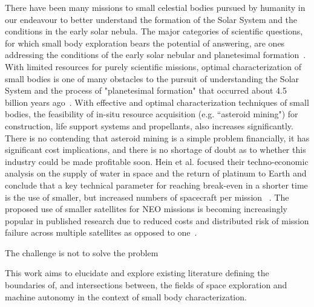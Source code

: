 There have been many missions to small celestial bodies pursued by humanity in our endeavour to better understand the formation of the Solar System and the conditions in the early solar nebula. The major categories of scientific questions, for which small body exploration bears the potential of answering, are ones addressing the conditions of the early solar nebular and planetesimal formation~\cite{Davidsson2021}. With limited resources for purely scientific missions, optimal characterization of small bodies is one of many obstacles to the pursuit of understanding the Solar System and the process of "planetesimal formation" that occurred about 4.5 billion years ago~\cite{Klahr2015}. With effective and optimal characterization techniques of small bodies, the feasibility of in-situ resource acquisition (e.g. ``asteroid mining") for construction, life support systems and propellants, also increases significantly. There is no contending that asteroid mining is a simple problem financially, it has significant cost implications, and there is no shortage of doubt as to whether this industry could be made profitable soon. Hein et al. focused their techno-economic analysis on the supply of water in space and the return of platinum to Earth and conclude that a key technical parameter for reaching break-even in a shorter time is the use of smaller, but increased numbers of spacecraft per mission ~\cite{Hein2020}. The proposed use of smaller satellites for \gls{NEO} missions is becoming increasingly popular in published research due to reduced costs and distributed risk of mission failure across multiple satellites as opposed to one~\cite{Wells2006, Laurin2008, Scott2013, Yu2014}.


The challenge is not to solve the problem


This work aims to elucidate and explore
existing literature defining the boundaries of, and intersections between, the
fields of space exploration and machine autonomy in the context of small body
characterization.




\cite{Rivkin2021}







